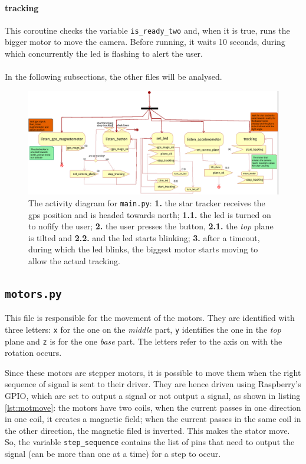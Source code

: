 \documentclass[]{article}
\begin{document}
\paragraph{tracking} This coroutine checks the variable \texttt{is\_ready\_two} and, when it is true, runs the bigger motor to move the camera. Before running, it waits 10 seconds, during which concurrently the led is flashing to alert the user. 
\\
\\
In the following subsections, the other files will be analysed. 

\begin{figure}[h]
	\includegraphics[width=\linewidth]{images/software/main_activity_diagram.png}
	\caption{The activity diagram for \texttt{main.py}: \textbf{1.} the star tracker receives the gps position and is headed towards north; \textbf{1.1.} the led is turned on to nofify the user; \textbf{2.} the user presses the button, \textbf{2.1.} the \textit{top} plane is tilted and \textbf{2.2.} and the led starts blinking; \textbf{3.} after a timeout, during which the led blinks, the biggest motor starts moving to allow the actual tracking.}
\end{figure}

\subsection{\texttt{motors.py}}
This file is responsible for the movement of the motors. They are identified with three letters: \texttt{x} for the one on the \textit{middle} part, \texttt{y} identifies the one in the \textit{top} plane and \texttt{z} is for the one \textit{base} part. The letters refer to the axis on with the rotation occurs.

Since these motors are stepper motors, it is possible to move them when the right sequence of signal is sent to their driver. They are hence driven using Raspberry's GPIO, which are set to output a signal or not output a signal, as shown in listing \ref{lst:motmove}: the motors have two coils, when the current passes in one direction in one coil, it creates a magnetic field; when the current passes in the same coil in the other direction, the magnetic filed is inverted. This makes the stator move. So, the variable \texttt{step\_sequence} contains the list of pins that need to output the signal (can be more than one at a time) for a step to occur. 
\end{document}
